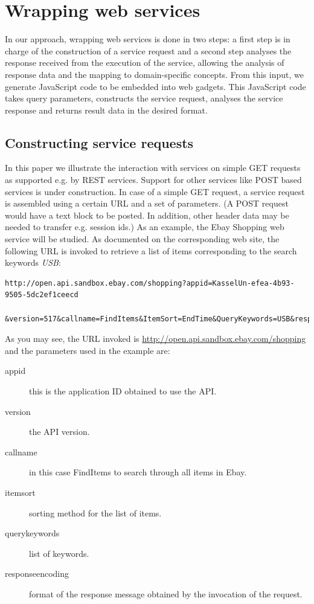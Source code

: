 
\section{Wrapping web services}
\label{sec:wrapping_web_services}

In our approach, wrapping web services is done in two steps: a first step is in charge of the construction of a service request and a second step analyses the response received from the execution of the service, allowing the analysis of response data and the mapping to domain-specific concepts. From this input, we generate JavaScript code to be embedded into web gadgets. This JavaScript code takes query parameters, constructs the service request, analyses the service response and returns result data in the desired format. 

\subsection{Constructing service requests} %
\label{sub:constructing_service_requests}

In this paper we illustrate the interaction with services on simple GET requests as supported e.g. by REST services. Support for other services like POST based services is under construction. In case of a simple GET request, a service request is assembled using a certain URL and a set of parameters. (A POST request would have a text block to be posted. In addition, other header data may be needed to transfer e.g. session ids.) As an example, the Ebay Shopping web service will be studied. As documented on the corresponding web site, the following URL is invoked to retrieve a list of items corresponding to the search keywords \emph{USB}:

\begin{listing}
\begin{verbatim}
http://open.api.sandbox.ebay.com/shopping?appid=KasselUn-efea-4b93-9505-5dc2ef1ceecd
  &version=517&callname=FindItems&ItemSort=EndTime&QueryKeywords=USB&responseencoding=XML
\end{verbatim}
\end{listing}

As you may see, the URL invoked is \url{http://open.api.sandbox.ebay.com/shopping} and the parameters used in the example are:
\begin{description}
	\item[appid] this is the application ID obtained to use the API.
	\item[version] the API version.
	\item[callname] in this case FindItems to search through all items in Ebay.
	\item[itemsort] sorting method for the list of items.
	\item[querykeywords] list of keywords.
	\item[responseencoding] format of the response message obtained by the invocation of the request.
\end{description}

